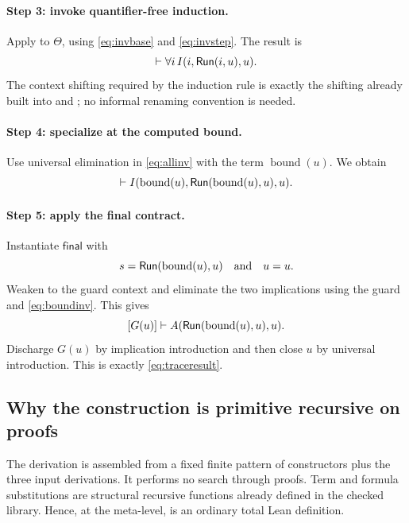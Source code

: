 \paragraph{Step 3: invoke quantifier-free induction.}
Apply  to \(\Theta\), using \eqref{eq:invbase} and
\eqref{eq:invstep}.  The result is
\begin{equation}
       [G(u)]\vdash \forall i\,I(i,\Run(i,u),u).
       \label{eq:allinv}
\end{equation}
The context shifting required by the induction rule is exactly the shifting
already built into  and ; no informal
renaming convention is needed.

\paragraph{Step 4: specialize at the computed bound.}
Use universal elimination in \eqref{eq:allinv} with the term
\(\operatorname{bound}(u)\).  We obtain
\begin{equation}
 [G(u)]\vdash
 I(\operatorname{bound}(u),
   \Run(\operatorname{bound}(u),u),u).
 \label{eq:boundinv}
\end{equation}

\paragraph{Step 5: apply the final contract.}
Instantiate \(\mathsf{final}\) with
\[
 s=\mathsf{Run}(\operatorname{bound}(u),u)
 \quad\text{and}\quad u=u.
\]
Weaken to the guard context and eliminate the two implications using the guard
and \eqref{eq:boundinv}.  This gives
\[
  [G(u)]\vdash
  A(\mathsf{Run}(\operatorname{bound}(u),u),u).
\]
Discharge \(G(u)\) by implication introduction and then close \(u\) by
universal introduction.  This is exactly \eqref{eq:traceresult}.

\subsection{Why the construction is primitive recursive on proofs}

The derivation is assembled from a fixed finite pattern of constructors plus
the three input derivations.  It performs no search through proofs.  Term and
formula substitutions are structural recursive functions already defined in
the checked library.  Hence, at the meta-level,  is an
ordinary total Lean definition.

